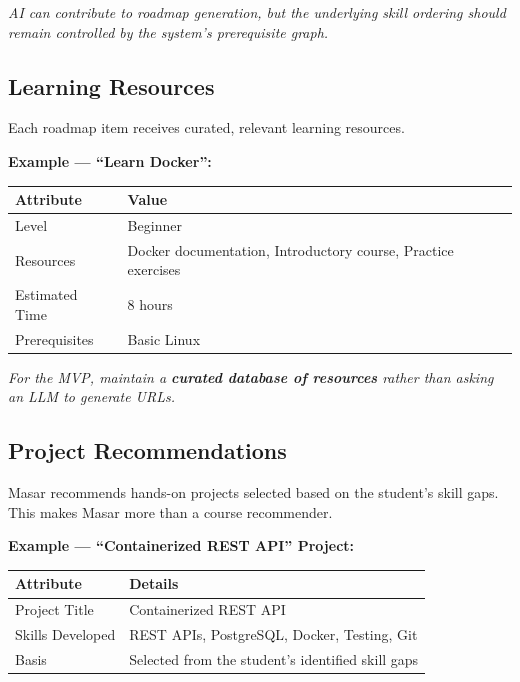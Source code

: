 \documentclass[12pt,a4paper]{article}
\begin{document}
\noindent\textit{AI can contribute to roadmap generation, but the underlying skill ordering should remain controlled by the system's prerequisite graph.}

\subsection{Learning Resources}
\label{sec:mvp-resources}

Each roadmap item receives curated, relevant learning resources.

\bigskip
\noindent\textbf{Example --- ``Learn Docker'':}

\begin{center}
\begin{tabular}{@{} l l @{}}
\toprule
\textbf{Attribute} & \textbf{Value} \\
\midrule
Level          & Beginner \\
Resources      & Docker documentation, Introductory course, Practice exercises \\
Estimated Time & 8 hours \\
Prerequisites  & Basic Linux \\
\bottomrule
\end{tabular}
\end{center}

\noindent\textit{For the MVP, maintain a \textbf{curated database of resources} rather than asking an LLM to generate URLs.}

\subsection{Project Recommendations}
\label{sec:mvp-projects}

Masar recommends hands-on projects selected based on the student's skill gaps. This makes Masar more than a course recommender.

\bigskip
\noindent\textbf{Example --- ``Containerized REST API'' Project:}

\begin{center}
\begin{tabular}{@{} l l @{}}
\toprule
\textbf{Attribute} & \textbf{Details} \\
\midrule
Project Title   & Containerized REST API \\
Skills Developed & REST APIs, PostgreSQL, Docker, Testing, Git \\
Basis           & Selected from the student's identified skill gaps \\
\bottomrule
\end{tabular}
\end{center}
\end{document}
